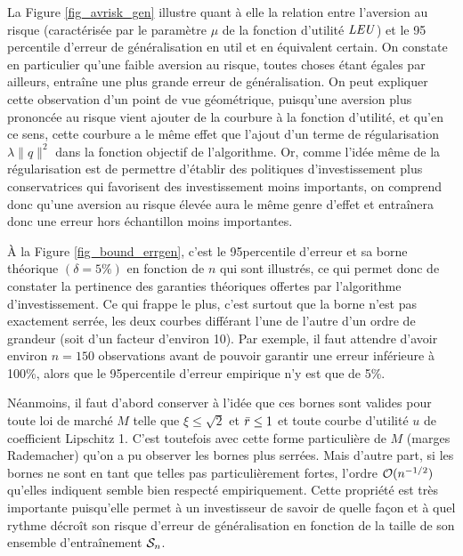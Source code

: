 La Figure \ref{fig_avrisk_gen} illustre quant à elle la relation entre l'aversion au
risque (caractérisée par le paramètre $\mu$ de la fonction d'utilité $\LEU$) et le 95\ieme
percentile d'erreur de généralisation en util et en équivalent certain. On constate en
particulier qu'une faible aversion au risque, toutes choses étant égales par ailleurs,
entraîne une plus grande erreur de généralisation. On peut expliquer cette observation
d'un point de vue géométrique, puisqu'une aversion plus prononcée au risque vient ajouter
de la courbure à la fonction d'utilité, et qu'en ce sens, cette courbure a le même effet
que l'ajout d'un terme de régularisation $\lambda\|q\|^2$ dans la fonction objectif de
l'algorithme. Or, comme l'idée même de la régularisation est de permettre d'établir des
politiques d'investissement plus conservatrices qui favorisent des investissement moins
importants, on comprend donc qu'une aversion au risque élevée aura le même genre d'effet
et entraînera donc une erreur hors échantillon moins importantes.

À la Figure \ref{fig_bound_errgen}, c'est le 95\ieme percentile d'erreur et sa borne
théorique $(\delta = 5\%)$ en fonction de $n$ qui sont illustrés, ce qui permet donc de
constater la pertinence des garanties théoriques offertes par l'algorithme
d'investissement. Ce qui frappe le plus, c'est surtout que la borne n'est pas exactement
serrée, les deux courbes différant l'une de l'autre d'un ordre de grandeur (soit d'un
facteur d'environ 10). Par exemple, il faut attendre d'avoir environ $n=150$ observations
avant de pouvoir garantir une erreur inférieure à 100\%, alors que le 95\ieme percentile
d'erreur empirique n'y est que de 5\%.

Néanmoins, il faut d'abord conserver à l'idée que ces bornes sont valides pour toute loi
de marché $M$ telle que $\xi\leq\sqrt{2}$ et $\rmax\leq 1$ et toute courbe d'utilité $u$ de
coefficient Lipschitz 1. C'est toutefois avec cette forme particulière de $M$ (marges
Rademacher) qu'on a pu observer les bornes plus serrées. Mais d'autre part, si les bornes
ne sont en tant que telles pas particulièrement fortes, l'ordre $\bigO(n^{-1/2})$ qu'elles
indiquent semble bien respecté empiriquement. Cette propriété est très importante
puisqu'elle permet à un investisseur de savoir de quelle façon et à quel rythme décroît
son risque d'erreur de généralisation en fonction de la taille de son ensemble
d'entraînement $\S_n$. 

